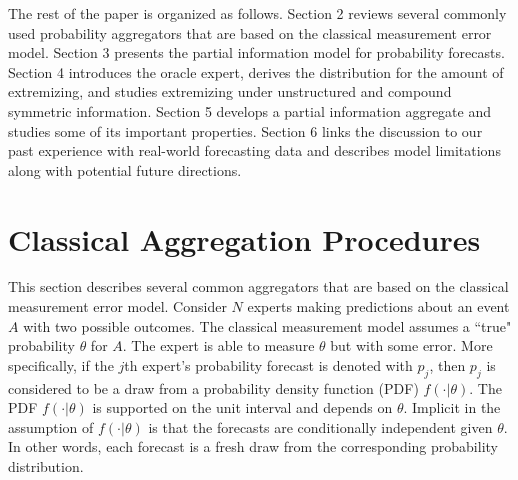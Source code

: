 \documentclass[11pt]{article}
\theoremstyle{definition}
\theoremstyle{definition}
\begin{document}
 
 
 












The rest of the paper is organized as follows. Section 2 reviews several commonly used probability aggregators that are based on the classical measurement error model. Section 3 presents the partial information model for probability forecasts. Section 4 introduces the oracle expert, derives the distribution for the amount of extremizing, and studies extremizing under unstructured and compound symmetric information. Section 5 develops a partial information aggregate and studies some of its important properties. Section 6 links the discussion to our past experience with real-world forecasting data and describes model limitations along with potential future directions. 


\section{Classical Aggregation Procedures}
This section describes several common aggregators that are based on the classical measurement error model. Consider $N$ experts making predictions about an event $A$ with two possible outcomes. The classical measurement model assumes a ``true" probability $\theta$ for $A$. The expert is able to measure $\theta$ but with some error. More specifically, if the $j$th expert's probability forecast is denoted with $p_j$, then $p_j$ is considered to be a draw from a probability density function (PDF) $f(\cdot | \theta)$. The PDF $f(\cdot | \theta)$ is supported on the unit interval and depends on $\theta$. Implicit in the assumption of $f(\cdot | \theta)$ is that the forecasts are conditionally independent given $\theta$. In other words, each forecast is a fresh draw from the corresponding probability distribution. 
\end{document}
